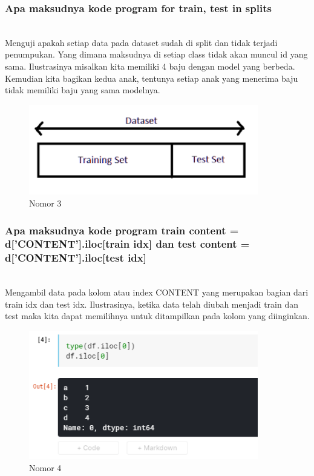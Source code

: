 	 
	\subsubsection{Apa maksudnya kode program for train, test in splits}
	\hfill\\
Menguji apakah setiap data pada dataset sudah di split dan
tidak terjadi penumpukan. Yang dimana maksudnya di setiap class tidak akan muncul
id yang sama. Ilustrasinya misalkan kita memiliki 4 baju dengan model yang berbeda.
Kemudian kita bagikan kedua anak, tentunya setiap anak yang menerima baju tidak
memiliki baju yang sama modelnya.

	\begin{figure}[H]
		\begin{center}
		 \includegraphics[width=10cm]{figures/1174076/figures7/teori3.png}
		 \caption{Nomor 3}	
		\end{center}
	\end{figure}

	\subsubsection{Apa maksudnya kode program train content = d[’CONTENT’].iloc[train idx] dan test content = d[’CONTENT’].iloc[test idx]}
	\hfill\\
Mengambil data pada kolom atau index CONTENT yang merupakan bagian dari train idx dan test idx. Ilustrasinya, ketika data telah diubah menjadi train dan test maka kita dapat memilihnya untuk ditampilkan pada kolom yang
diinginkan.


	\begin{figure}[H]
		\begin{center}
		 \includegraphics[width=10cm]{figures/1174076/figures7/teori4.png}
		 \caption{Nomor 4}	
		\end{center}
	\end{figure}
	

